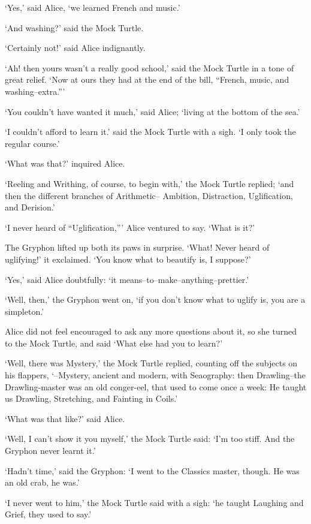 \documentclass[statementpaper,twoside,openany]{memoir}
\begin{document}
`Yes,' said Alice, `we learned French and music.'

`And washing?' said the Mock Turtle.

`Certainly not!' said Alice indignantly.

`Ah! then yours wasn't a really good school,' said the Mock Turtle in a tone of great relief. `Now at ours they had at the end of the bill, ``French, music, and washing--extra.'''

`You couldn't have wanted it much,' said Alice; `living at the bottom of the sea.'

`I couldn't afford to learn it.' said the Mock Turtle with a sigh. `I only took the regular course.'

`What was that?' inquired Alice.

`Reeling and Writhing, of course, to begin with,' the Mock Turtle replied; `and then the different branches of Arithmetic-- Ambition, Distraction, Uglification, and Derision.'

`I never heard of ``Uglification,''' Alice ventured to say. `What is it?'

The Gryphon lifted up both its paws in surprise. `What! Never heard of uglifying!' it exclaimed. `You know what to beautify is, I suppose?'

`Yes,' said Alice doubtfully: `it means--to--make--anything--prettier.'

`Well, then,' the Gryphon went on, `if you don't know what to uglify is, you are a simpleton.'

Alice did not feel encouraged to ask any more questions about it, so she turned to the Mock Turtle, and said `What else had you to learn?'

`Well, there was Mystery,' the Mock Turtle replied, counting off the subjects on his flappers, `--Mystery, ancient and modern, with Seaography: then Drawling--the Drawling-master was an old conger-eel, that used to come once a week: He taught us Drawling, Stretching, and Fainting in Coils.'

`What was that like?' said Alice.

`Well, I can't show it you myself,' the Mock Turtle said: `I'm too stiff. And the Gryphon never learnt it.'

`Hadn't time,' said the Gryphon: `I went to the Classics master, though. He was an old crab, he was.'

`I never went to him,' the Mock Turtle said with a sigh: `he taught Laughing and Grief, they used to say.'
\end{document}
